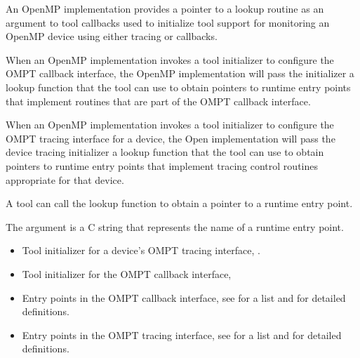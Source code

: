 \descr

An OpenMP implementation provides a pointer to a lookup routine as an
argument to tool callbacks used to initialize tool support for
monitoring an OpenMP device using either tracing or callbacks.



When an OpenMP implementation invokes a tool initializer to configure
the OMPT callback interface, the OpenMP implementation will pass the
initializer a lookup function that the tool can use to obtain
pointers to runtime entry points that implement routines that are part of
the OMPT callback interface.

When an OpenMP implementation invokes a tool initializer to configure
the OMPT tracing interface for a device, the Open implementation will
pass the device tracing initializer a lookup function that the tool
can use to obtain pointers to runtime entry points that implement
tracing control routines appropriate for that device.

A tool can call the lookup function to obtain a pointer to a runtime
entry point.

\argdesc
The argument  is a C string
that represents the name of a runtime entry point.

\crossreferences
\begin{itemize}
\item Tool initializer for a device's OMPT tracing interface, 
.
\item Tool initializer for the OMPT callback interface, 
\item Entry points in the OMPT callback interface, see
   for a list and
   for detailed definitions.
\item Entry points in the OMPT tracing interface, see
   for a list and
   for detailed definitions.
\end{itemize}
